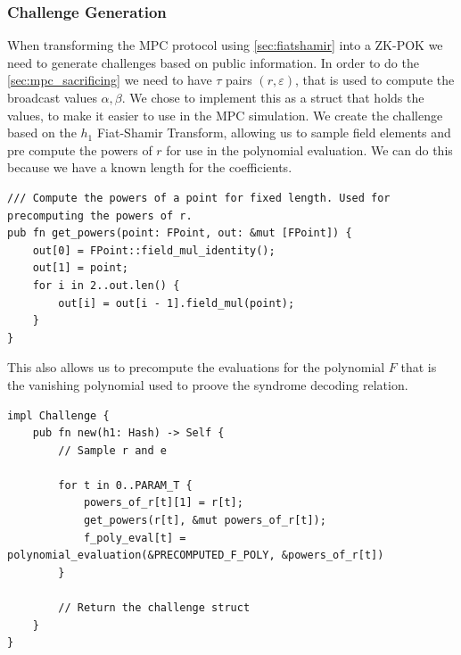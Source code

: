 \documentclass[11pt]{report}
\theoremstyle{definition}
\theoremstyle{plain}
\begin{document}
\subsubsection{Challenge Generation}
When transforming the MPC protocol using \autoref{sec:fiatshamir} into a ZK-POK we need to generate challenges based on public information. In order to do the \autoref{sec:mpc_sacrificing} we need to have $\tau$ pairs $(r, \varepsilon)$, that is used to compute the broadcast values $\alpha, \beta$.
We chose to implement this as a struct that holds the values, to make it easier to use in the MPC simulation. We create the challenge based on the $h_1$ Fiat-Shamir Transform, allowing us to sample field elements and pre compute the powers of $r$ for use in the polynomial evaluation. We can do this because we have a known length for the coefficients.
\begin{verbatim}
/// Compute the powers of a point for fixed length. Used for precomputing the powers of r.
pub fn get_powers(point: FPoint, out: &mut [FPoint]) {
    out[0] = FPoint::field_mul_identity();
    out[1] = point;
    for i in 2..out.len() {
        out[i] = out[i - 1].field_mul(point);
    }
}
\end{verbatim}
This also allows us to precompute the evaluations for the polynomial $F$ that is the vanishing polynomial used to proove the syndrome decoding relation.
\begin{verbatim}
impl Challenge {
    pub fn new(h1: Hash) -> Self {
        // Sample r and e

        for t in 0..PARAM_T {
            powers_of_r[t][1] = r[t];
            get_powers(r[t], &mut powers_of_r[t]);
            f_poly_eval[t] = polynomial_evaluation(&PRECOMPUTED_F_POLY, &powers_of_r[t])
        }

        // Return the challenge struct
    }
}
\end{verbatim}
\end{document}
